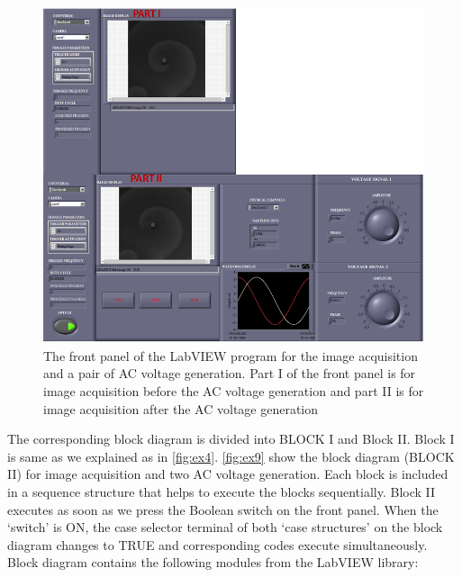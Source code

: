 \documentclass[journal=jacsat,manuscript=article]{achemso}
\begin{document}
\begin{figure}[H]
    \centering
    \includegraphics[width=\linewidth]{polarised.png}
    \caption{The front panel of the LabVIEW program for the image
      acquisition and a pair of AC voltage generation. Part I of the
      front panel is for image acquisition before the AC voltage
      generation and part II is for image acquisition after the AC
      voltage generation}
    \label{fig:ex7}
\end{figure}
The corresponding block diagram is divided into BLOCK I and Block II. Block I is same as we explained as in \ref{fig:ex4}.  \ref{fig:ex9} show the block diagram (BLOCK II) for image acquisition and two AC voltage generation.  Each block is included in a
sequence structure that helps to execute the blocks sequentially. Block II executes as
soon as we press the Boolean switch on the front panel. When the
‘switch’ is ON, the case selector terminal of both ‘case structures’
on the block diagram changes to TRUE and corresponding codes execute
simultaneously. 
Block diagram contains the following modules from the LabVIEW library: 
\end{document}
